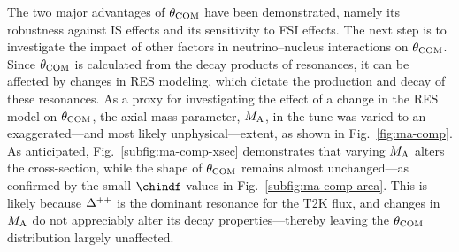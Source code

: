      The two major advantages of $\theta_{\textrm{COM}}$ have been demonstrated, namely its robustness against IS effects and its sensitivity to FSI effects.
     The next step is to investigate the impact of other factors in neutrino–nucleus interactions on $\theta_{\textrm{COM}}$.
     Since $\theta_{\textrm{COM}}$ is calculated from the decay products of resonances, it can be affected by changes in RES modeling, which dictate the production and decay of these resonances.
     As a proxy for investigating the effect of a change in the RES model on $\theta_{\textrm{COM}}$, the axial mass parameter, $M_{\textrm{A}}$, in the \gZero tune was varied to an exaggerated—and most likely unphysical—extent, as shown in Fig.~\ref{fig:ma-comp}.
     As anticipated, Fig.~\ref{subfig:ma-comp-xsec} demonstrates that varying $M_{\textrm{A}}$ alters the cross-section, while the shape of $\theta_{\textrm{COM}}$ remains almost unchanged—as confirmed by the small $\chindf$ values in Fig.~\ref{subfig:ma-comp-area}.
     This is likely because $\Delta^{++}$ is the dominant resonance for the T2K flux, and changes in $M_{\textrm{A}}$ do not appreciably alter its decay properties—thereby leaving the $\theta_{\textrm{COM}}$ distribution largely unaffected.
